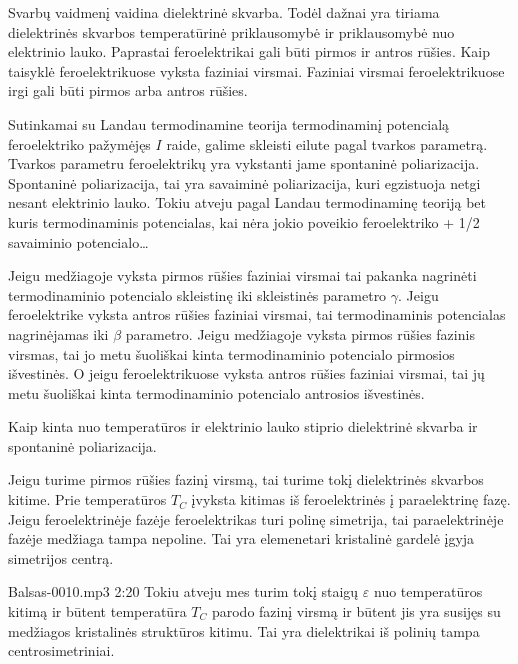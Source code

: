 \begin{note}
  Svarbų vaidmenį vaidina dielektrinė skvarba. Todėl dažnai yra
  tiriama dielektrinės skvarbos temperatūrinė priklausomybė ir
  priklausomybė nuo elektrinio lauko. Paprastai feroelektrikai
  gali būti pirmos ir antros rūšies. Kaip taisyklė
  feroelektrikuose vyksta faziniai virsmai. Faziniai virsmai
  feroelektrikuose irgi gali būti pirmos arba antros rūšies.

  Sutinkamai su Landau termodinamine teorija termodinaminį
  potencialą feroelektriko pažymėjęs $I$ raide, galime
  skleisti eilute pagal tvarkos parametrą. Tvarkos parametru
  feroelektrikų yra vykstanti jame spontaninė poliarizacija.
  Spontaninė poliarizacija, tai yra savaiminė poliarizacija,
  kuri egzistuoja netgi nesant elektrinio lauko. Tokiu
  atveju pagal Landau termodinaminę teoriją bet kuris
  termodinaminis potencialas, kai nėra jokio poveikio
  feroelektriko + 1/2 \alpha savaiminio potencialo…

  Jeigu medžiagoje vyksta pirmos rūšies faziniai virsmai tai
  pakanka nagrinėti termodinaminio potencialo skleistinę iki
  skleistinės parametro $\gamma$. Jeigu feroelektrike vyksta
  antros rūšies faziniai virsmai, tai termodinaminis
  potencialas nagrinėjamas iki $\beta$ parametro. Jeigu
  medžiagoje vyksta pirmos rūšies fazinis virsmas, tai jo
  metu šuoliškai kinta termodinaminio potencialo pirmosios
  išvestinės. O jeigu feroelektrikuose vyksta antros rūšies faziniai
  virsmai, tai jų metu šuoliškai kinta termodinaminio potencialo
  antrosios išvestinės.
  
  Kaip kinta nuo temperatūros ir elektrinio lauko stiprio dielektrinė
  skvarba ir spontaninė poliarizacija.

  Jeigu turime pirmos rūšies fazinį virsmą, tai turime tokį dielektrinės
  skvarbos kitime. Prie temperatūros $T_{C}$ įvyksta kitimas iš
  feroelektrinės į paraelektrinę fazę. Jeigu feroelektrinėje fazėje
  feroelektrikas turi polinę simetrija, tai paraelektrinėje
  fazėje medžiaga tampa nepoline. Tai yra elemenetari kristalinė
  gardelė įgyja simetrijos centrą.
   
  Balsas-0010.mp3 2:20
  Tokiu atveju mes turim tokį staigų $\varepsilon$ nuo temperatūros
  kitimą ir būtent temperatūra $T_{C}$ parodo fazinį virsmą ir būtent
  jis yra susijęs su medžiagos kristalinės struktūros kitimu.
  Tai yra dielektrikai iš polinių tampa centrosimetriniai.


\end{note}
